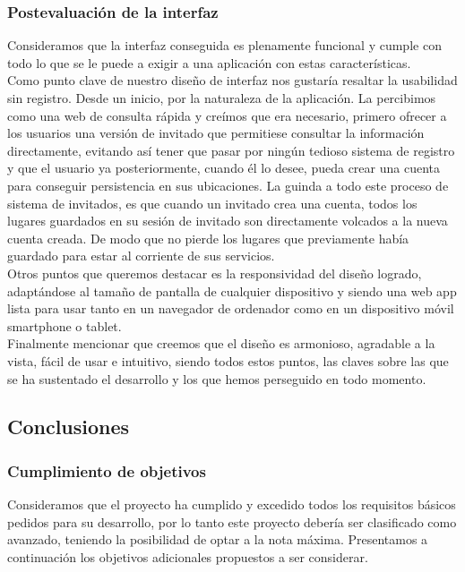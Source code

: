 \documentclass[../ei103948-project-documentation.tex]{subfiles}
\begin{document}
        \subsubsection{Postevaluación de la interfaz}
        Consideramos que la interfaz conseguida es plenamente funcional y cumple con todo lo que se le puede a exigir a  una aplicación con estas características.\\

        Como punto clave de nuestro diseño de interfaz nos gustaría resaltar la usabilidad sin registro. Desde un inicio, por la naturaleza de la aplicación. La percibimos como una web de consulta rápida y creímos que era necesario, primero ofrecer a los usuarios una versión de invitado que permitiese consultar la información directamente, evitando así tener que pasar por ningún tedioso sistema de registro y que el usuario ya posteriormente, cuando él lo desee, pueda crear una cuenta para conseguir persistencia en sus ubicaciones. La guinda a todo este proceso de sistema de invitados, es que cuando un invitado crea una cuenta, todos los lugares guardados en su sesión de invitado son directamente volcados a la nueva cuenta creada. De modo que no pierde los lugares que previamente había guardado para estar al corriente de sus servicios.\\

        Otros puntos que queremos destacar es la responsividad del diseño logrado, adaptándose al tamaño de pantalla de cualquier dispositivo y siendo una web app lista para usar tanto en un navegador de ordenador como en un dispositivo móvil smartphone o tablet.\\

        Finalmente mencionar que creemos que  el diseño es armonioso, agradable a la vista, fácil de usar e intuitivo, siendo todos estos puntos, las claves sobre las que se ha sustentado el desarrollo y los que hemos perseguido en todo momento.


    \subsection{Conclusiones}

        \subsubsection{Cumplimiento de objetivos}
        Consideramos que el proyecto ha cumplido y excedido todos los requisitos básicos pedidos para su desarrollo, por lo tanto este proyecto debería ser clasificado como avanzado, teniendo la posibilidad de optar a la nota máxima. Presentamos a continuación los objetivos adicionales propuestos a ser considerar.\\
\end{document}
